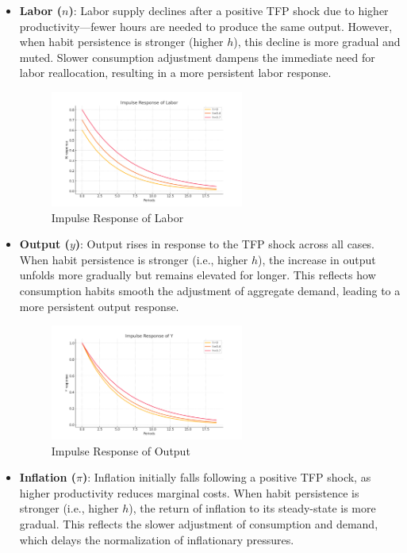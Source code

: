 \documentclass[12pt,a4paper,notitlepage]{article}
\numberwithin{equation}{section}
\begin{document}
\begin{itemize}
\begin{itemize}
\begin{itemize}
  \item \textbf{Labor (\( n \))}: Labor supply declines after a positive TFP shock due to higher productivity—fewer hours are needed to produce the same output. However, when habit persistence is stronger (higher \( h \)), this decline is more gradual and muted. Slower consumption adjustment dampens the immediate need for labor reallocation, resulting in a more persistent labor response.


\begin{figure}[H]
  \centering
  \includegraphics[width=0.6\textwidth]{IRF_Labor.png}
  \caption{Impulse Response of Labor}
\end{figure}

  \item \textbf{Output (\( y \))}: Output rises in response to the TFP shock across all cases. When habit persistence is stronger (i.e., higher \( h \)), the increase in output unfolds more gradually but remains elevated for longer. This reflects how consumption habits smooth the adjustment of aggregate demand, leading to a more persistent output response.

\begin{figure}[H]
  \centering
  \includegraphics[width=0.6\textwidth]{IRF_Output.png}
  \caption{Impulse Response of Output}
\end{figure}

  \item \textbf{Inflation (\( \pi \))}: Inflation initially falls following a positive TFP shock, as higher productivity reduces marginal costs. When habit persistence is stronger (i.e., higher \( h \)), the return of inflation to its steady-state is more gradual. This reflects the slower adjustment of consumption and demand, which delays the normalization of inflationary pressures.



\end{itemize}
\end{itemize}
\end{itemize}
\end{document}
